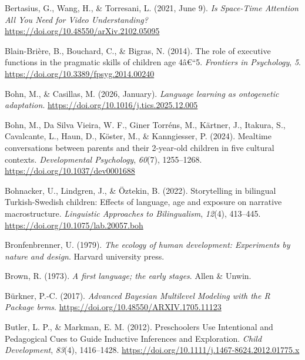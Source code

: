 \documentclass[
  english,
  12pt,
  man,floatsintext]{apa6}
\newlength{\cslhangindent}
\newenvironment{CSLReferences}[2] %
 {\begin{list}{}{%
  \setlength{\itemindent}{0pt}
  \setlength{\leftmargin}{0pt}
  \setlength{\parsep}{0pt}
  \ifodd #1
   \setlength{\leftmargin}{\cslhangindent}
   \setlength{\itemindent}{-1\cslhangindent}
  \fi
  \setlength{\itemsep}{#2\baselineskip}}}
 {\end{list}}
\begin{document}
\begin{CSLReferences}{1}{0}
Bertasius, G., Wang, H., \& Torresani, L. (2021, June 9). \emph{Is {Space-Time Attention All You Need} for {Video Understanding}?} \url{https://doi.org/10.48550/arXiv.2102.05095}

Blain-Brière, B., Bouchard, C., \& Bigras, N. (2014). The role of executive functions in the pragmatic skills of children age 4â€``5. \emph{Frontiers in Psychology}, \emph{5}. \url{https://doi.org/10.3389/fpsyg.2014.00240}

Bohn, M., \& Casillas, M. (2026, January). \emph{Language learning as ontogenetic adaptation}. \url{https://doi.org/10.1016/j.tics.2025.12.005}

Bohn, M., Da Silva Vieira, W. F., Giner Torréns, M., Kärtner, J., Itakura, S., Cavalcante, L., Haun, D., Köster, M., \& Kanngiesser, P. (2024). Mealtime conversations between parents and their 2-year-old children in five cultural contexts. \emph{Developmental Psychology}, \emph{60}(7), 1255--1268. \url{https://doi.org/10.1037/dev0001688}

Bohnacker, U., Lindgren, J., \& Öztekin, B. (2022). Storytelling in bilingual {Turkish-Swedish} children: {Effects} of language, age and exposure on narrative macrostructure. \emph{Linguistic Approaches to Bilingualism}, \emph{12}(4), 413--445. \url{https://doi.org/10.1075/lab.20057.boh}

Bronfenbrenner, U. (1979). \emph{The ecology of human development: Experiments by nature and design}. Harvard university press.

Brown, R. (1973). \emph{A first language; the early stages}. Allen \& Unwin.

Bürkner, P.-C. (2017). \emph{Advanced {Bayesian Multilevel Modeling} with the {R Package} brms}. \url{https://doi.org/10.48550/ARXIV.1705.11123}

Butler, L. P., \& Markman, E. M. (2012). Preschoolers {Use Intentional} and {Pedagogical Cues} to {Guide Inductive Inferences} and {Exploration}. \emph{Child Development}, \emph{83}(4), 1416--1428. \url{https://doi.org/10.1111/j.1467-8624.2012.01775.x}


\end{CSLReferences}
\end{document}
